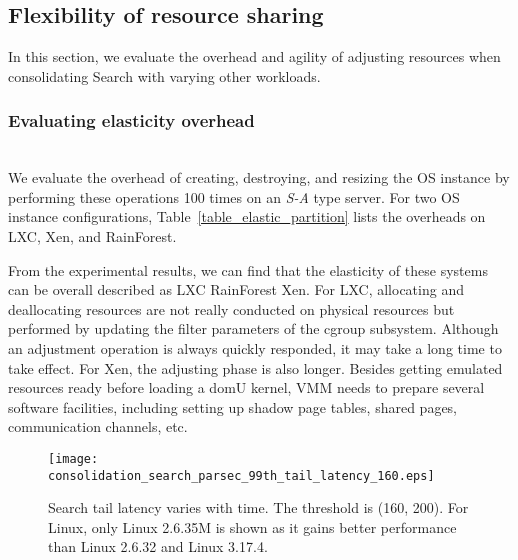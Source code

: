 \documentclass[pageno]{jpaper}
\begin{document}
\subsection{Flexibility of resource sharing}
In this section, we evaluate the overhead and agility of adjusting resources when consolidating Search with varying other workloads.


\subsubsection{Evaluating elasticity overhead}
\textrm{\\} We evaluate the overhead of creating, destroying, and resizing the OS instance  by  performing these operations 100 times on an \emph{S-A} type server. For two OS instance configurations, Table~\ref{table_elastic_partition} lists the overheads on LXC, Xen, and RainForest.

From the experimental results, we can find that the elasticity of these systems can be overall described as LXC  RainForest  Xen. For LXC, allocating and deallocating  resources are not really conducted on physical resources but performed by updating the filter parameters of the cgroup subsystem. Although an adjustment operation is always quickly responded, it may take a long time to take effect. For Xen, the adjusting phase is also longer. Besides getting emulated resources ready before loading a domU kernel, VMM needs to prepare several software facilities, including setting up shadow page tables, shared pages, communication channels, etc.






















\begin{figure}[t]
\setlength{\abovecaptionskip}{3pt}
\setlength{\belowcaptionskip}{0pt}
  \centering
\texttt{[image: consolidation\_search\_parsec\_99th\_tail\_latency\_160.eps]}
  \caption{Search tail latency varies with time. The threshold  is (160, 200). For Linux, only Linux 2.6.35M is shown as it gains better performance than Linux 2.6.32 and Linux 3.17.4.}
  \label{fig_tail_latency_consolidation_parsec}
\end{figure}
\end{document}
